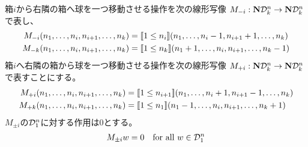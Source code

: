 	箱$i$から右隣の箱へ球を一つ移動させる操作を次の線形写像
	$M_{-i}:{\mathbf{N}}{\mathcal{D}}_k^n\to{\mathbf{N}}{\mathcal{D}}_k^n$で表し、
	\begin{equation*}\begin{split} %
		M_{-i}(n_1,\dots,n_i,n_{i+1},\dots,n_k)
		&= \jump{1\le n_i}(n_1,\dots,n_i-1,n_{i+1}+1,\dots,n_k) \\
		M_{-k}(n_1,\dots,n_i,n_{i+1},\dots,n_k)
		&= \jump{1\le n_k}(n_1+1,\dots,n_i,n_{i+1},\dots,n_k-1) \\
	\end{split}\end{equation*} %
	箱$i$へ右隣の箱から球を一つ移動させる操作を次の線形写像
	$M_{+i}:{\mathbf{N}}{\mathcal{D}}_k^n\to{\mathbf{N}}{\mathcal{D}}_k^n$で表すことにする。
	\begin{equation*}\begin{split} %
		M_{+i}(n_1,\dots,n_i,n_{i+1},\dots,n_k)
		&= \jump{1\le n_{i+1}}(n_1,\dots,n_i+1,n_{i+1}-1,\dots,n_k) \\
		M_{+k}(n_1,\dots,n_i,n_{i+1},\dots,n_k)
		&= \jump{1\le n_1}(n_1-1,\dots,n_i,n_{i+1},\dots,n_k+1) \\
	\end{split}\end{equation*} %
	$M_{\pm i}$の${\mathcal{D}}_1^n$に対する作用は$0$とする。
	\begin{equation*}\begin{split} %
		M_{\pm i}w = 0 \quad\text{for all }w\in\mycal{D}_1^n \\
	\end{split}\end{equation*} %

